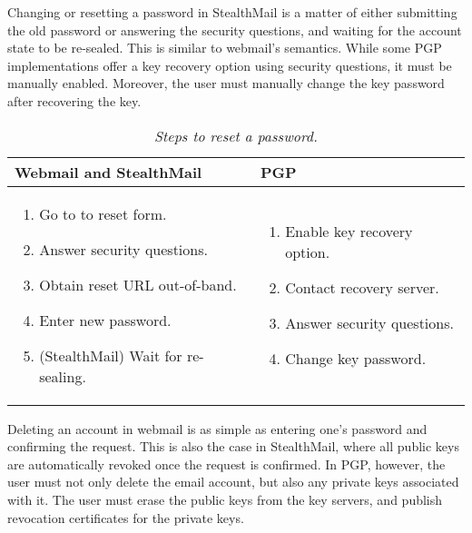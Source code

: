 Changing or resetting a password in StealthMail is a matter of either submitting the old password or answering the security questions, and waiting for the account state to be re-sealed.  This is similar to webmail’s semantics.  While some PGP implementations offer a key recovery option using security questions, it must be manually enabled.  Moreover, the user must manually change the key password after recovering the key.


\begin{table}[ht!]
\begin{tabular}{ | L{3.5cm} | L{3.5cm} |}
\hline
\textbf{Webmail and StealthMail} & \textbf{PGP} \\
\hline
\vspace{-3mm}
\begin{enumerate}
  \item{Go to to reset form.}
  \item{Answer security questions.} 
  \item{Obtain reset URL out-of-band.}
  \item{Enter new password.}
  \item{(StealthMail) Wait for re-sealing.}
\end{enumerate} 
\vspace{-\topsep} &

\vspace{-3mm}
\begin{enumerate}
  \item{Enable key recovery option.}
  \item{Contact recovery server.}
  \item{Answer security questions.}
  \item{Change key password.}
\end{enumerate} 
\vspace{-\topsep} \\

\hline
\end{tabular}
\caption{\it Steps to reset a password.}
\label{tab:account-creation}
\end{table}

Deleting an account in webmail is as simple as entering one’s password and confirming the request.  This is also the case in StealthMail, where all public keys are automatically revoked once the request is confirmed.  In PGP, however, the user must not only delete the email account, but also any private keys associated with it.  The user must erase the public keys from the key servers, and publish revocation certificates for the private keys.

